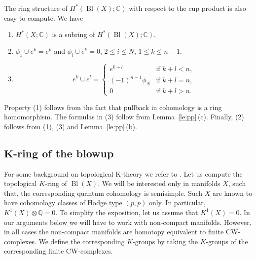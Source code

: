 \documentclass[10pt,a4paper]{article}
\numberwithin{equation}{section}
\newcommand{\CC}{\mathbb{C}}
\newcommand{\QQ}{\mathbb{Q}}
\begin{document}
The ring structure of $H^*(\operatorname{Bl}(X);\CC)$ with respect to
the cup product is also easy to compute. We have
\begin{enumerate}\itemsep=0pt
\item[(1)]
 $H^*(X;\CC)$ is a subring of $H^*(\operatorname{Bl}(X);\CC)$.
\item[(2)]
$\phi_1\cup e^k=e^k$ and
$\phi_i \cup e^k = 0$, $2\leq i\leq N$, $1\leq k\leq n-1$.
\item[(3)]
\[
e^k\cup e^l=\begin{cases}
e^{k+l} & \mbox{if } k+l<n,\\
(-1)^{n-1}\phi_N & \mbox{if } k+l=n,\\
0 & \mbox{if } k+l >n.
\end{cases}
\]
\end{enumerate}
Property (1) follows from the fact that pullback in cohomology is a
ring homomorphism. The formulas in (3) follow from
Lemma~\ref{le:pp}\,(c). Finally, (2) follows from (1), (3) and Lemma~\ref{le:pp}\,(b).

\subsection[K-ring of the blowup]{$\boldsymbol{K}$-ring of the blowup}
For some background on topological K-theory we refer to
\cite[Chapter~6]{FoFu2016}.
Let us compute the topological $K$-ring of $\operatorname{Bl}(X)$. We will be interested
only in manifolds $X$, such that, the corresponding quantum cohomology
is semisimple. Such $X$ are known to have cohomology classes of Hodge
type $(p,p)$ only. In particular, $K^{1}(X)\otimes \QQ=0$. To simplify the
exposition, let us assume that $K^1(X)=0$. In our arguments below we
will have to work with non-compact manifolds. However, in all cases
the non-compact manifolds are homotopy equivalent to finite
CW-complexes. We define the corresponding $K$-groups by taking the
$K$-groups of the corresponding finite CW-complexes.
\end{document}
